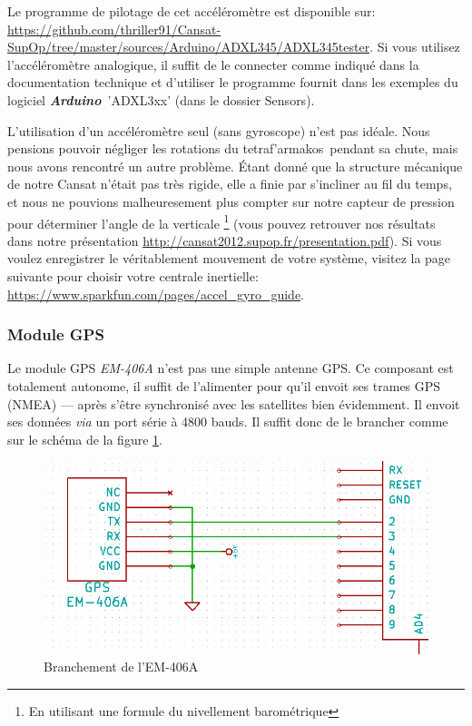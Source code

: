 \documentclass[twocolumn, 8pt]{article}
\newcommand\tet{\textgreek{tetraf'armakos}~}
\newcommand\Ard{\textbf{\emph{Arduino}}~}
\begin{document}
\par Le programme de pilotage de cet accéléromètre est disponible sur: \url{https://github.com/thriller91/Cansat-SupOp/tree/master/sources/Arduino/ADXL345/ADXL345tester}. Si vous utilisez l'accéléromètre analogique, il suffit de le connecter comme indiqué dans la documentation technique et d'utiliser le programme fournit dans les exemples du logiciel \Ard \textsf{'ADXL3xx'} (dans le dossier \textsf{Sensors}).

\par L'utilisation d'un accéléromètre seul (sans gyroscope) n'est pas idéale. Nous pensions pouvoir négliger les rotations du \tet pendant sa chute, mais nous avons rencontré un autre problème. Étant donné que la structure mécanique de notre Cansat n'était pas très rigide, elle a finie par s'incliner au fil du temps, et nous ne pouvions malheuresement plus compter sur notre capteur de pression pour déterminer l'angle de la verticale \footnote{En utilisant une formule du nivellement barométrique} (vous pouvez retrouver nos résultats dans notre présentation \url{http://cansat2012.supop.fr/presentation.pdf}). Si vous voulez enregistrer le véritablement mouvement de votre système, visitez la page suivante pour choisir votre centrale inertielle: \url{https://www.sparkfun.com/pages/accel_gyro_guide}.

\subsubsection{Module GPS}
\par Le module GPS \emph{EM-406A} n'est pas une simple antenne GPS. Ce composant est totalement autonome, il suffit de l'alimenter pour qu'il envoit ses trames GPS (NMEA) --- après s'être synchronisé avec les satellites bien évidemment. Il envoit ses données \textit{via} un port série à 4800 bauds. Il suffit donc de le brancher comme sur le schéma de la figure \ref{GPS}.

\begin{figure}[!h]
	\centering
	\includegraphics[scale=.25]{EM-406A.png}
	\caption{Branchement de l'EM-406A}
	\label{GPS}
\end{figure}
\end{document}
